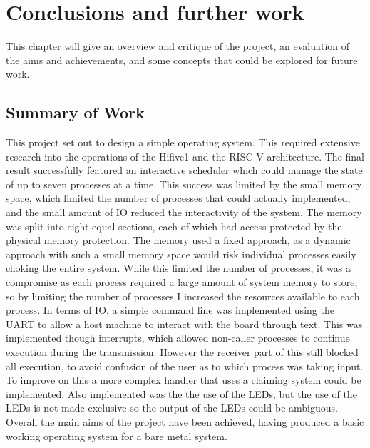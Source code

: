 \chapter[Conclusions and further work]{Conclusions and further work}
\label{cha:conc}
This chapter will give an overview and critique of the project, an evaluation of the aims and achievements, and some concepts that could be explored for future work.  
\section{Summary of Work}
This project set out to design a simple operating system. This required extensive research into the operations of the Hifive1 and the RISC-V architecture. The final result successfully featured an interactive scheduler which could manage the state of up to seven processes at a time. This success was limited by the small memory space, which limited the number of processes that could actually implemented, and the small amount of IO reduced the interactivity of the system. The memory was split into eight equal sections, each of which had access protected by the physical memory protection. The memory used a fixed approach, as a dynamic approach with such a small memory space would risk individual processes easily choking the entire system. While this limited the number of processes, it was a compromise as each process required a large amount of system memory to store, so by limiting the number of processes I increased the resources available to each process. In terms of IO, a simple command line was implemented using the UART to allow a host machine to interact with the board through text. This was implemented though interrupts, which allowed non-caller processes to continue execution during the transmission. However the receiver part of this still blocked all execution, to avoid confusion of the user as to which process was taking input. To improve on this a more complex handler that uses a claiming system could be implemented. Also implemented was the the use of the LEDs, but the use of the LEDs is not made exclusive so the output of the LEDs could be ambiguous. Overall the main aims of the project have been achieved, having produced a basic working operating system for a bare metal system. 

